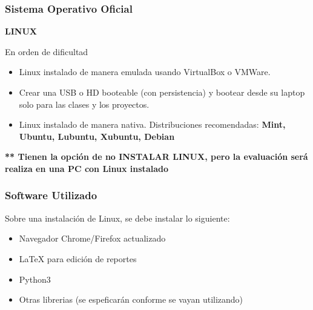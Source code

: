 \begin{frame}
\frametitle{Sistema Operativo Oficial}

\textbf{LINUX}
\begin{block}{En orden de dificultad}
\begin{itemize}
\item Linux instalado de manera emulada usando VirtualBox o VMWare.
\item Crear una USB o HD booteable (con persistencia) y bootear desde su laptop solo para las clases y los proyectos.
\item Linux instalado de manera nativa. Distribuciones recomendadas: \textbf{Mint, Ubuntu, Lubuntu, Xubuntu, Debian}
\end{itemize}
\end{block}
\textbf{** Tienen la opción de no INSTALAR LINUX, pero la evaluación será realiza en una PC con Linux instalado}
\end{frame}


\begin{frame}
\frametitle{Software Utilizado}
Sobre una instalación de Linux, se debe instalar lo siguiente:
\begin{itemize}
\item Navegador Chrome/Firefox actualizado
\item LaTeX para edición de reportes
\item Python3
\item Otras librerias (se espeficarán conforme se vayan utilizando)
\end{itemize}
\end{frame}

